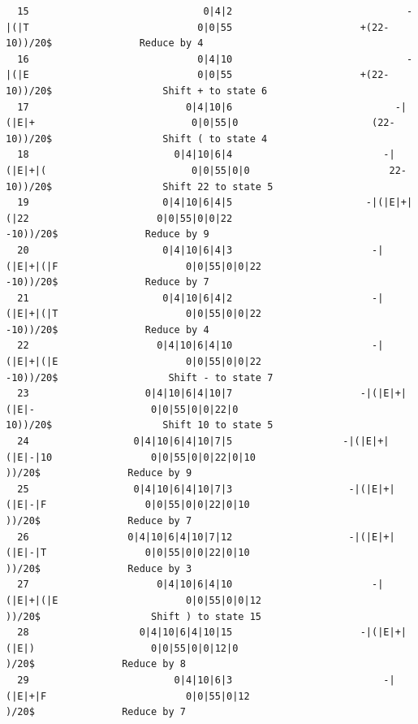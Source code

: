 \documentclass[UTF8]{ctexart}
\begin{document}
\begin{lstlisting}
  15                              0|4|2                              -|(|T                             0|0|55                      +(22-10))/20$               Reduce by 4
  16                             0|4|10                              -|(|E                             0|0|55                      +(22-10))/20$                   Shift + to state 6
  17                           0|4|10|6                            -|(|E|+                           0|0|55|0                       (22-10))/20$                   Shift ( to state 4
  18                         0|4|10|6|4                          -|(|E|+|(                         0|0|55|0|0                        22-10))/20$                   Shift 22 to state 5
  19                       0|4|10|6|4|5                       -|(|E|+|(|22                      0|0|55|0|0|22                          -10))/20$               Reduce by 9
  20                       0|4|10|6|4|3                        -|(|E|+|(|F                      0|0|55|0|0|22                          -10))/20$               Reduce by 7
  21                       0|4|10|6|4|2                        -|(|E|+|(|T                      0|0|55|0|0|22                          -10))/20$               Reduce by 4
  22                      0|4|10|6|4|10                        -|(|E|+|(|E                      0|0|55|0|0|22                          -10))/20$                   Shift - to state 7
  23                    0|4|10|6|4|10|7                      -|(|E|+|(|E|-                    0|0|55|0|0|22|0                           10))/20$                   Shift 10 to state 5
  24                  0|4|10|6|4|10|7|5                   -|(|E|+|(|E|-|10                 0|0|55|0|0|22|0|10                             ))/20$               Reduce by 9
  25                  0|4|10|6|4|10|7|3                    -|(|E|+|(|E|-|F                 0|0|55|0|0|22|0|10                             ))/20$               Reduce by 7
  26                 0|4|10|6|4|10|7|12                    -|(|E|+|(|E|-|T                 0|0|55|0|0|22|0|10                             ))/20$               Reduce by 3
  27                      0|4|10|6|4|10                        -|(|E|+|(|E                      0|0|55|0|0|12                             ))/20$                   Shift ) to state 15
  28                   0|4|10|6|4|10|15                      -|(|E|+|(|E|)                    0|0|55|0|0|12|0                              )/20$               Reduce by 8
  29                         0|4|10|6|3                          -|(|E|+|F                        0|0|55|0|12                              )/20$               Reduce by 7

\end{lstlisting}
\end{document}
